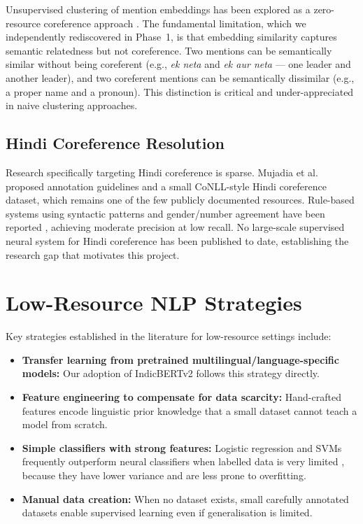 \documentclass[12pt,a4paper]{report}
\begin{document}
Unsupervised clustering of mention embeddings has been explored as a zero-resource coreference approach \cite{moosavi2016coreference}. The fundamental limitation, which we independently rediscovered in Phase~1, is that embedding similarity captures semantic relatedness but not coreference. Two mentions can be semantically similar without being coreferent (e.g., \textit{ek neta} and \textit{ek aur neta} --- one leader and another leader), and two coreferent mentions can be semantically dissimilar (e.g., a proper name and a pronoun). This distinction is critical and under-appreciated in naive clustering approaches.

\subsection{Hindi Coreference Resolution}

Research specifically targeting Hindi coreference is sparse. Mujadia et al.\ \cite{mujadia2016hindi} proposed annotation guidelines and a small CoNLL-style Hindi coreference dataset, which remains one of the few publicly documented resources. Rule-based systems using syntactic patterns and gender/number agreement have been reported \cite{dakwale2013anaphora}, achieving moderate precision at low recall. No large-scale supervised neural system for Hindi coreference has been published to date, establishing the research gap that motivates this project.

\section{Low-Resource NLP Strategies}

Key strategies established in the literature for low-resource settings \cite{hedderich2021survey} include:

\begin{itemize}
    \item \textbf{Transfer learning from pretrained multilingual/language-specific models:} Our adoption of IndicBERTv2 follows this strategy directly.
    \item \textbf{Feature engineering to compensate for data scarcity:} Hand-crafted features encode linguistic prior knowledge that a small dataset cannot teach a model from scratch.
    \item \textbf{Simple classifiers with strong features:} Logistic regression and SVMs frequently outperform neural classifiers when labelled data is very limited \cite{lappin1994algorithm}, because they have lower variance and are less prone to overfitting.
    \item \textbf{Manual data creation:} When no dataset exists, small carefully annotated datasets enable supervised learning even if generalisation is limited.
\end{itemize}
\end{document}
